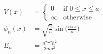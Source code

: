 

\vspace*{\fill}
\centering

\begin{align*}
    V(x) &= 
   \begin{cases}
       0 & \mbox{if } 0 \leq x \leq a \\
       \infty & \mbox{otherwise}
   \end{cases}
   \\
    \phi_{n}(x) &= \sqrt{\frac{2}{a}}\sin{\Big( \frac{n\pi x}{a} \Big)} \\
    E_{n} &= \frac{n^2\pi^2\hbar^2}{2ma^2}
\end{align*}

\centering
\vspace*{\fill}

